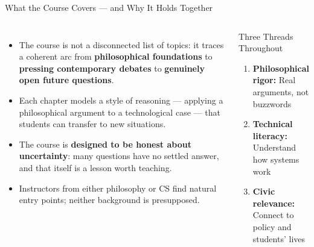 \documentclass[aspectratio=169,10pt]{beamer}
\begin{document}
\begin{frame}{What the Course Covers --- and Why It Holds Together}
\begin{columns}[c]
\begin{itemize}
  \item The course is not a disconnected list of topics: it traces a coherent arc from \textbf{philosophical foundations} to \textbf{pressing contemporary debates} to \textbf{genuinely open future questions}.
  \item Each chapter models a style of reasoning --- applying a philosophical argument to a technological case --- that students can transfer to new situations.
  \item The course is \textbf{designed to be honest about uncertainty}: many questions have no settled answer, and that itself is a lesson worth teaching.
  \item Instructors from either philosophy or CS find natural entry points; neither background is presupposed.
\end{itemize}
\begin{block}{Three Threads Throughout}
\footnotesize
\begin{enumerate}
  \item \textbf{Philosophical rigor:} Real arguments, not buzzwords
  \item \textbf{Technical literacy:} Understand how systems work
  \item \textbf{Civic relevance:} Connect to policy and students' lives
\end{enumerate}
\end{block}
\end{columns}
\end{frame}
\end{document}
